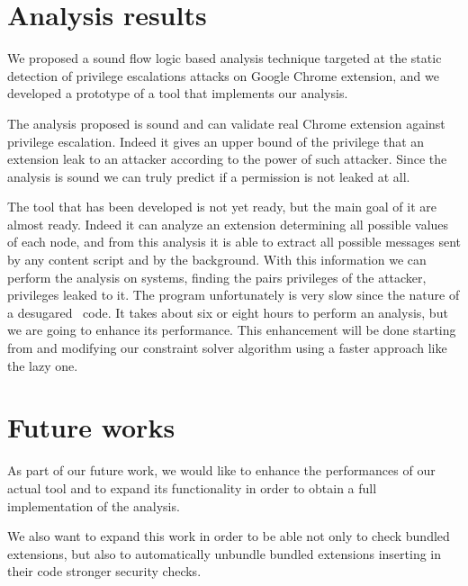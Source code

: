 \section{Analysis results}
We proposed a sound flow logic based analysis technique targeted at the static detection of privilege escalations attacks on Google Chrome extension, and we developed a prototype of a tool that implements our analysis.

The analysis proposed is sound and can validate real Chrome extension against privilege escalation. Indeed it gives an upper bound of the privilege that an extension leak to an attacker according to the power of such attacker. Since the analysis is sound we can truly predict if a permission is not leaked at all.

The tool that has been developed is not yet ready, but the main goal of it are almost ready. Indeed it can analyze an extension determining all possible values of each node, and from this analysis it is able to extract all possible messages sent by any content script and by the background. With this information we can perform the analysis on systems, finding the pairs privileges of the attacker, privileges leaked to it. The program unfortunately is very slow since the nature of a desugared \ljs\ code. It takes about six or eight hours to perform an analysis, but we are going to enhance its performance. This enhancement will be done starting from \cite{TAJS, TAJSDOM, TAJSLazy} and modifying our constraint solver algorithm using a faster approach like the lazy one.

\section{Future works}%
\label{sec:FutureWorks}
As part of our future work, we would like to enhance the performances of our actual tool and to expand its functionality in order to obtain a full implementation of the analysis.

We also want to expand this work in order to be able not only to check bundled extensions, but also to automatically unbundle bundled extensions inserting in their code stronger security checks.

